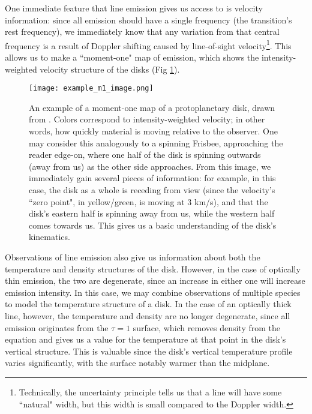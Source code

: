 One immediate feature that line emission gives us access to is velocity information: since all emission should have a single frequency (the transition's rest frequency), we immediately know that any variation from that central frequency is a result of Doppler shifting caused by line-of-sight velocity\footnote{Technically, the uncertainty principle tells us that a line will have some ``natural" width, but this width is small compared to the Doppler width.}. This allows us to make a ``moment-one" map of emission, which shows the intensity-weighted velocity structure of the disks (Fig \ref{fig:ex_mom1}).


\begin{figure} %
\centering
  \texttt{[image: example\_m1\_image.png]}
  \caption{An example of a moment-one map of a protoplanetary disk, drawn from \citet{Rosenfeld2012}. Colors correspond to intensity-weighted velocity; in other words, how quickly material is moving relative to the observer. One may consider this analogously to a spinning Frisbee, approaching the reader edge-on, where one half of the disk is spinning outwards (away from us) as the other side approaches. From this image, we immediately gain several pieces of information: for example, in this case, the disk as a whole is receding from view (since the velocity's ``zero point", in yellow/green, is moving at 3 km/s), and that the disk's eastern half is spinning away from us, while the western half comes towards us. This gives us a basic understanding of the disk's kinematics.}
  \label{fig:ex_mom1}
\end{figure}


Observations of line emission also give us information about both the temperature and density structures of the disk. However, in the case of optically thin emission, the two are degenerate, since an increase in either one will increase emission intensity. In this case, we may combine observations of multiple species to model the temperature structure of a disk. In the case of an optically thick line, however, the temperature and density are no longer degenerate, since all emission originates from the $\tau=1$ surface, which removes density from the equation and gives us a value for the temperature at that point in the disk's vertical structure. This is valuable since the disk's vertical temperature profile varies significantly, with the surface notably warmer than the midplane.

